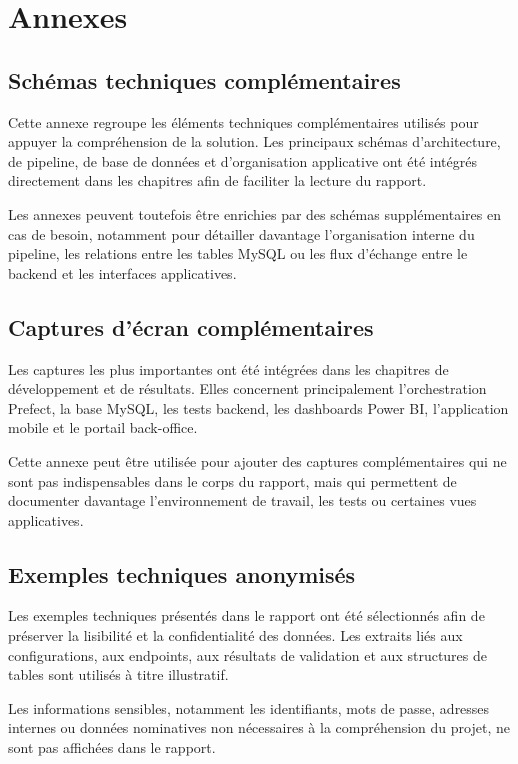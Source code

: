 \chapter{Annexes}

\section{Schémas techniques complémentaires}

Cette annexe regroupe les éléments techniques complémentaires utilisés pour appuyer la compréhension de la solution. Les principaux schémas d’architecture, de pipeline, de base de données et d’organisation applicative ont été intégrés directement dans les chapitres afin de faciliter la lecture du rapport.

Les annexes peuvent toutefois être enrichies par des schémas supplémentaires en cas de besoin, notamment pour détailler davantage l’organisation interne du pipeline, les relations entre les tables MySQL ou les flux d’échange entre le backend et les interfaces applicatives.

\section{Captures d’écran complémentaires}

Les captures les plus importantes ont été intégrées dans les chapitres de développement et de résultats. Elles concernent principalement l’orchestration Prefect, la base MySQL, les tests backend, les dashboards Power BI, l’application mobile et le portail back-office.

Cette annexe peut être utilisée pour ajouter des captures complémentaires qui ne sont pas indispensables dans le corps du rapport, mais qui permettent de documenter davantage l’environnement de travail, les tests ou certaines vues applicatives.

\section{Exemples techniques anonymisés}

Les exemples techniques présentés dans le rapport ont été sélectionnés afin de préserver la lisibilité et la confidentialité des données. Les extraits liés aux configurations, aux endpoints, aux résultats de validation et aux structures de tables sont utilisés à titre illustratif.

Les informations sensibles, notamment les identifiants, mots de passe, adresses internes ou données nominatives non nécessaires à la compréhension du projet, ne sont pas affichées dans le rapport.